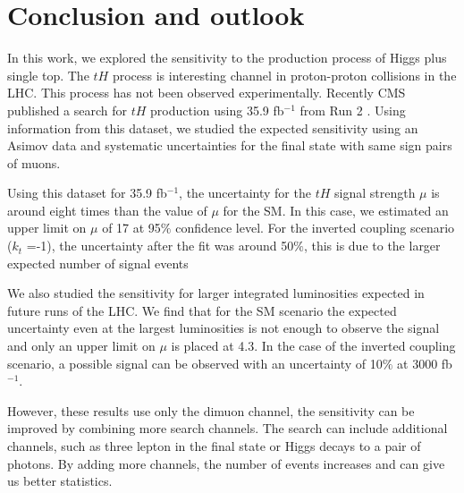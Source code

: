 
\chapter{Conclusion and outlook}
In this work, we explored the sensitivity to the production process of Higgs plus single top.
The $tH$ process is interesting channel in proton-proton collisions in the LHC. This process has not been observed experimentally. Recently CMS published a search for $tH$ production using 35.9 fb$^{-1}$ from Run 2 . Using information from this dataset, we studied the expected sensitivity using an Asimov data and systematic uncertainties for the final state with same sign pairs of muons. 

Using this dataset for 35.9 fb$^{-1}$, the uncertainty for the $tH$ signal strength $\mu$ is around eight times than the value of $\mu$ for the SM. In this case, we estimated an upper limit on $\mu$ of 17 at 95$\%$ confidence level. 
For the inverted coupling scenario ($k_t$ =-1), the uncertainty after the fit was around 50$\%$, this is due to the larger expected number of signal events

We also studied the sensitivity for larger integrated luminosities expected in future runs of the LHC. We find that for the SM scenario the expected uncertainty even at the largest luminosities is not enough to observe the signal and only an upper limit on $\mu$ is placed at 4.3. In the case of the inverted coupling scenario, a possible signal can be observed with an uncertainty of 10$\%$ at 3000 fb$^{-1}$.

However, these results use only the dimuon channel, the sensitivity can be improved by combining more search channels. The search can include additional channels, such as three lepton in the final state or Higgs decays to a pair of photons. By adding more channels, the number of events increases and can give us better statistics. 




